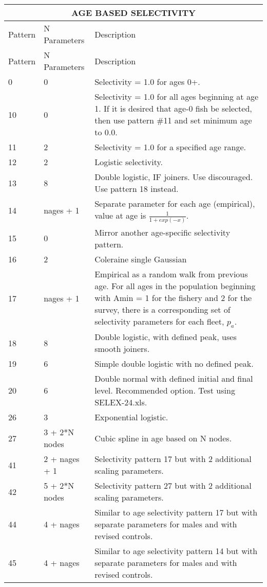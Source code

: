 \begin{longtable}{p{2cm} p{3cm} p{10cm}}
	\multicolumn{3}{c}{AGE BASED SELECTIVITY}\\
	\endfirsthead

	\hline
	Pattern & N Parameters & Description \Tstrut\Bstrut\\
	\hline
	\endhead

	\hline
	\endfoot
	\endlastfoot
	
	\hline
	Pattern & N Parameters & Description  \Tstrut\Bstrut\\
	\hline
	0  \Tstrut& 0 & Selectivity = 1.0 for ages 0+.\\
	10 \Tstrut& 0 & Selectivity = 1.0 for all ages beginning at age 1.  If it is desired that age-0 fish be selected, then use pattern \#11 and set minimum age to 0.0. \\
	11 \Tstrut& 2 & Selectivity = 1.0 for a specified age range.\\
	12 \Tstrut& 2 & Logistic selectivity.\\
	13 \Tstrut& 8 & Double logistic, IF joiners.  Use discouraged.  Use pattern 18 instead.\\
	14 \Tstrut& nages + 1 & Separate parameter for each age (empirical), value at age is $\frac{1}{1+exp(-x)}$. \\
	15 \Tstrut& 0 & Mirror another age-specific selectivity pattern.\\
	16 \Tstrut& 2 & Coleraine single Gaussian\\
	17 \Tstrut& nages + 1 & Empirical as a random walk from previous age.  For all ages in the population beginning with Amin = 1 for the fishery and 2 for the survey, there is a corresponding set of selectivity parameters for each fleet, $p_a$. \\
	18 \Tstrut& 8 & Double logistic, with defined peak, uses smooth joiners.  \\
	19 \Tstrut& 6 & Simple double logistic with no defined peak.\\
	20 \Tstrut& 6 & Double normal with defined initial and final level.  Recommended option. Test using SELEX-24.xls.\\
	26 \Tstrut& 3 & Exponential logistic.\\
	27 \Tstrut& 3 + 2*N nodes & Cubic spline in age based on N nodes.\\
	41 \Tstrut& 2 + nages + 1 & Selectivity pattern 17 but with 2 additional scaling parameters. \\
	42 \Tstrut& 5 + 2*N nodes & Selectivity pattern 27 but with 2 additional scaling parameters. \\
	44 \Tstrut& 4 + nages & Similar to age selectivity pattern 17 but with separate parameters for males and with revised controls. \\
	45 \Tstrut& 4 + nages & Similar to age selectivity pattern 14 but with separate parameters for males and with revised controls.\Bstrut\\
	\hline
\end{longtable}



